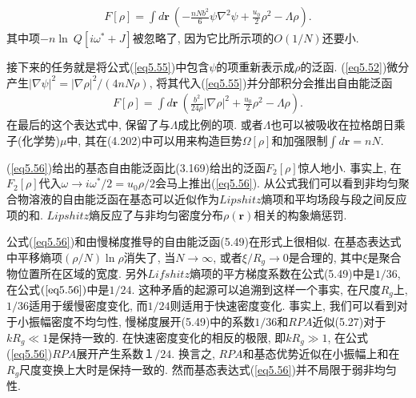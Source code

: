     \label{subsec.equations}
    \begin{equation}
        \begin{aligned}
            F[\rho]=\int d\bm{r}\
            \left(-\frac{nNb^{2}}{6}\psi\nabla^{2}\psi+\frac{u_{0}}{2}\rho^{2}-\Lambda\rho
            \right).
                   \end{aligned}
        \label{eq5.55}
    \end{equation}
其中项$-n\ln\ Q[i\omega^{*}+J]$被忽略了, 因为它比所示项的$O(1/N)$还要小.
\par
接下来的任务就是将公式(\ref{eq5.55})中包含$\psi$的项重新表示成$\rho$的泛函.
(\ref{eq5.52})微分产生$|\nabla\psi|^{2}=|\nabla\rho|^{2}/(4nN\rho)$,
将其代入(\ref{eq5.55})并分部积分会推出自由能泛函
    \label{subsec.equations}
    \begin{equation}
        \begin{aligned}
            F[\rho]=\int d\bm{r}\
            \left(\frac{b^{2}}{24\rho}|\nabla\rho|^{2}+\frac{u_{0}}{2}\rho^{2}-\Lambda\rho
            \right).
                   \end{aligned}
        \label{eq5.56}
    \end{equation}
在最后的这个表达式中, 保留了与$\Lambda$成比例的项.
或者$\Lambda$也可以被吸收在拉格朗日乘子(化学势)$\mu$中,
其在(4.202)中可以用来构造巨势$\Omega[\rho]$和加强限制$\int d\bm{r}=nN$.
\par
(\ref{eq5.56})给出的基态自由能泛函比(3.169)给出的泛函$F_{2}[\rho]$惊人地小.
事实上, 在$F_{2}[\rho]$代入$\omega\longrightarrow
i\omega^{*}/2=u_{0}\rho/2$会马上推出(\ref{eq5.56}).
从公式我们可以看到非均匀聚合物溶液的自由能泛函在基态可以近似作为$Lipshitz$熵项和平均场段与段之间反应项的和.
$Lipshitz$熵反应了与非均匀密度分布$\rho(\bm{r})$相关的构象熵惩罚.
\par
公式(\ref{eq5.56})和由慢梯度推导的自由能泛函(5.49)在形式上很相似.
在基态表达式中平移熵项$(\rho/N)\ln\rho$消失了, 当$N\longrightarrow \infty$,
或者$\xi/R_{g}\longrightarrow 0$是合理的,
其中$\xi$是聚合物位置所在区域的宽度. 
另外$Lifshitz$熵项的平方梯度系数在公式(5.49)中是$1/36$,
在公式$(\ref{eq5.56})$中是$1/24$. 这种矛盾的起源可以追溯到这样一个事实,
在尺度$R_{g}$上, $1/36$适用于缓慢密度变化, 而$1/24$则适用于快速密度变化.
事实上, 我们可以看到对于小振幅密度不均匀性,
慢梯度展开(5.49)中的系数$1/36$和$RPA$近似(5.27)对于$kR_{g}\ll 1$是保持一致的.
在快速密度变化的相反的极限, 即$kR_{g}\gg 1$,
在公式(\ref{eq5.56})$RPA$展开产生系数$１/24$. 换言之,
$RPA$和基态优势近似在小振幅上和在$R_{g}$尺度变换上大时是保持一致的.
然而基态表达式(\ref{eq5.56})并不局限于弱非均匀性.
